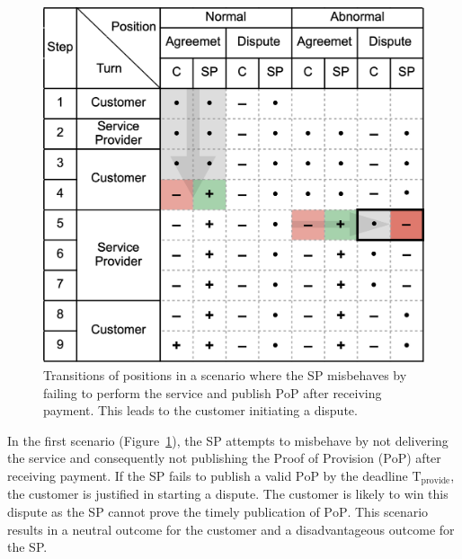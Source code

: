 \documentclass[pdftex,twocolumn,epjc3]{svjour3}
\begin{document}
\begin{figure}[h!]
\includegraphics[width=\linewidth]{misbehaviour.png}
\centering
\caption{Transitions of positions in a scenario where the SP misbehaves by failing to perform the service and publish $\mathrm{PoP}$ after receiving payment. This leads to the customer initiating a dispute.}
\label{fig:misbehaviour}
\end{figure}

In the first scenario (Figure~\ref{fig:misbehaviour}), the SP attempts to misbehave by not delivering the service and consequently not publishing the Proof of Provision ($\mathrm{PoP}$) after receiving payment. If the SP fails to publish a valid $\mathrm{PoP}$ by the deadline $\mathrm{T}_\mathrm{provide}$, the customer is justified in starting a dispute. The customer is likely to win this dispute as the SP cannot prove the timely publication of $\mathrm{PoP}$. This scenario results in a neutral outcome for the customer and a disadvantageous outcome for the SP.
\end{document}
